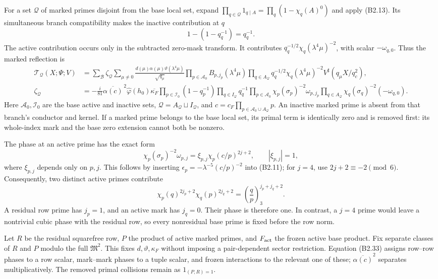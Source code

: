 \documentclass[11pt,a4paper]{article}
\begin{document}
For a set \(\mathcal Q\) of marked primes disjoint from the base local
set, expand \(\prod_{q\in\mathcal Q}1_{q\mid A}=\prod_q(1-\chi_q(A)^0)\)
and apply (B2.13). Its simultaneous branch compatibility makes the
inactive contribution at \(q\) \[
1-(1-q_q^{-1})=q_q^{-1}.
\] The active contribution occurs only in the subtracted zero-mask
transform. It contributes \(q_q^{-1/2}\chi_q(\lambda^4\mu)^{-2}\), with
scalar \(-\omega_{q,\allowbreak{}0}\). Thus the marked reflection is \[
\begin{aligned}
\mathcal T_{\mathcal Q}(X;\Psi;V)
&=\sum_{\mathcal B}\zeta_{\mathcal Q}
\sum_{\mu\ne0}\frac{d(\mu)\alpha(\mu)\vartheta(\lambda^4\mu)}{\sqrt{q_\mu}}
\prod_{p\in\mathcal A_0}B_{p,j_p}(\lambda^4\mu)
\prod_{q\in A_{\mathcal Q}}q_q^{-1/2}\chi_q(\lambda^4\mu)^{-2}
V^\sharp(q_\mu X/q_c^2),\\
\zeta_{\mathcal Q}
&=-\frac i{81}\overline{\alpha(c)}^{\,2}
\widehat\varphi(h_0)\overline{\kappa_F}
\prod_{p\in\mathcal I_0}(1-q_p^{-1})\prod_{q\in I_{\mathcal Q}}q_q^{-1}
\prod_{p\in\mathcal A_0}\chi_p(\sigma_p)^{-2}\omega_{p,j_p}
\prod_{q\in A_{\mathcal Q}}\chi_q(\sigma_q)^{-2}(-\omega_{q,0}).
\end{aligned}
\tag{B2.31}
\] Here \(\mathcal A_0,\allowbreak{}\mathcal I_0\) are the base active and inactive
sets, \(\mathcal Q=A_{\mathcal Q}\sqcup I_{\mathcal Q}\), and
\(c=c_F\prod_{p\in\mathcal A_0\cup A_{\mathcal Q}}p\). An inactive
marked prime is absent from that branch's conductor and kernel. If a
marked prime belongs to the base local set, its primal term is
identically zero and is removed first: its whole-index mark and the base
zero extension cannot both be nonzero.

The phase at an active prime has the exact form \[
\chi_p(\sigma_p)^{-2}\omega_{p,j}
=\xi_{p,j}\chi_p(c/p)^{2j+2},
\qquad |\xi_{p,j}|=1,
\tag{B2.32}
\] where \(\xi_{p,\allowbreak{}j}\) depends only on \(p,\allowbreak{}j\). This follows by
inserting \(\epsilon_p=-\lambda^{-5}(c/p)^{-2}\) into (B2.11); for
\(j=4\), use \(2j+2\equiv-2\pmod6\). Consequently, two distinct active
primes contribute \[
\chi_p(q)^{2j_p+2}\chi_q(p)^{2j_q+2}
=\left(\frac qp\right)_3^{j_p+j_q+2}.
\tag{B2.33}
\] A residual row prime has \(j_p=1\), and an active mark has \(j_q=0\).
Their phase is therefore one. In contrast, a \(j=4\) prime would leave a
nontrivial cubic phase with the residual row, so every nonresidual base
prime is fixed before the row norm.

Let \(R\) be the residual squarefree row, \(P\) the product of active
marked primes, and \(F_{\rm act}\) the frozen active base product. Fix
separate classes of \(R\) and \(P\) modulo the full \(\mathfrak M^2\).
This fixes \(d,\allowbreak{}\vartheta,\allowbreak{}\kappa_F\) without imposing a pair-dependent
sector restriction. Equation (B2.33) assigns row--row phases to a row
scalar, mark--mark phases to a tuple scalar, and frozen interactions to
the relevant one of these; \(\overline{\alpha(c)}^2\) separates
multiplicatively. The removed primal collisions remain as
\(1_{(P,\allowbreak{}R)=1}\).
\end{document}
